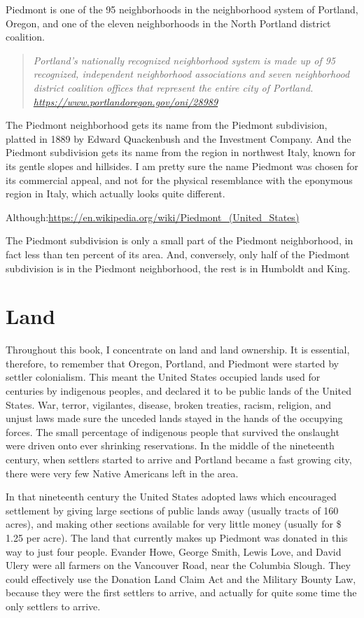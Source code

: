 \documentclass[
  12pt,
]{book}
\begin{document}
Piedmont is one of the 95 neighborhoods in the neighborhood system of Portland, Oregon, and one of the eleven neighborhoods in the North Portland district coalition.

\begin{quote}
\emph{Portland's nationally recognized neighborhood system is made up of 95 recognized,
independent neighborhood associations and seven neighborhood district coalition offices
that represent the entire city of Portland.
\url{https://www.portlandoregon.gov/oni/28989}}
\end{quote}

The Piedmont neighborhood gets its name from the Piedmont subdivision, platted in 1889 by Edward Quackenbush and the Investment Company. And the Piedmont subdivision gets its name from the region in northwest Italy, known for its gentle slopes and hillsides. I am pretty sure the name Piedmont was chosen for its commercial appeal, and not for the physical resemblance with the eponymous region in Italy, which actually looks quite different.

Although:\url{https://en.wikipedia.org/wiki/Piedmont_(United_States)}

The Piedmont subdivision is only a small part of the Piedmont neighborhood, in fact less than ten percent of its area. And, conversely, only half of the Piedmont subdivision is in the Piedmont neighborhood, the rest is in Humboldt and King.

\hypertarget{land}{%
\section{Land}\label{land}}

Throughout this book, I concentrate on land and land ownership. It is essential, therefore, to remember that Oregon, Portland, and Piedmont were started by settler colonialism. This meant the United States occupied lands used for centuries by indigenous peoples, and declared it to be public lands of the United States. War, terror, vigilantes, disease, broken treaties, racism, religion, and unjust laws made sure the unceded lands stayed in the hands of the occupying forces. The small percentage of indigenous people that survived the onslaught were driven onto ever shrinking reservations. In the middle of the nineteenth century, when settlers started to arrive and Portland became a fast growing city, there were very few Native Americans left in the area.

In that nineteenth century the United States adopted laws which encouraged settlement by giving large sections of public lands away (usually tracts of 160 acres), and making other sections available for very little money (usually for \$ 1.25 per acre). The land that currently makes up Piedmont was donated in this way to just four people. Evander Howe, George Smith, Lewis Love, and David Ulery were all farmers on the Vancouver Road, near the Columbia Slough. They could effectively use the Donation Land Claim Act and the Military Bounty Law, because they were the first settlers to arrive, and actually for quite some time the only settlers to arrive.
\end{document}
